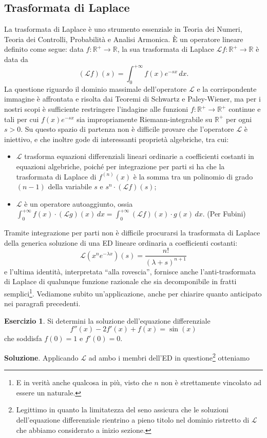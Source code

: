 \documentclass[a4paper,twoside]{article}
\newcommand{\R}{\mathbb{R}}
\theoremstyle{definition}
\newtheorem{ex}[theorem]{Esercizio}
\numberwithin{theorem}{section}
\begin{document}
\subsection{Trasformata di Laplace}
La trasformata di Laplace è uno strumento essenziale in Teoria dei Numeri, Teoria dei Controlli, Probabilità e Analisi Armonica. È un operatore lineare definito come segue: data $f:\R^+\to\R$, la sua trasformata di Laplace $\mathcal{L}f:\R^+\to \R$ è data da
$$ (\mathcal{L} f)(s) = \int_{0}^{+\infty} f(x) e^{-sx}\,dx. $$
La questione riguardo il dominio massimale dell'operatore $\mathcal{L}$ e la corrispondente immagine è affrontata e risolta dai Teoremi di Schwartz e Paley-Wiener, ma per i nostri scopi è sufficiente restringere l'indagine alle funzioni $f:\R^+\to\R^+$ continue e tali per cui $f(x)e^{-sx}$ sia impropriamente Riemann-integrabile su $\R^+$ per ogni $s>0$. Su questo spazio di partenza non è difficile provare che l'operatore $\mathcal{L}$ è iniettivo, e che inoltre gode di interessanti proprietà algebriche, tra cui:
\begin{itemize}
 \item $\mathcal{L}$ trasforma equazioni differenziali lineari ordinarie a coefficienti costanti in equazioni algebriche, poiché per integrazione per parti si ha che la trasformata di Laplace di $f^{(n)}(x)$ è la somma tra un polinomio di grado $(n-1)$ della variabile $s$ e $s^n\cdot(\mathcal{L}f)(s)$;
 \item $\mathcal{L}$ è un operatore autoaggiunto, ossia $\int_{0}^{+\infty}f(x)\cdot(\mathcal{L}g)(x)\,dx = \int_{0}^{+\infty}(\mathcal{L} f)(x)\cdot g(x)\,dx.$ (Per Fubini) 
\end{itemize}
Tramite integrazione per parti non è difficile procurarsi la trasformata di Laplace della generica soluzione di una ED lineare ordinaria a coefficienti costanti:
$$ \mathcal{L}\left( x^n e^{-\lambda x} \right)(s) = \frac{n!}{(\lambda+s)^{n+1}}$$
e l'ultima identità, interpretata ``alla rovescia'', fornisce anche l'anti-trasformata di Laplace di qualunque funzione razionale che sia decomponibile in fratti semplici\footnote{E in verità anche qualcosa in più, visto che $n$ non è strettamente vincolato ad essere un naturale.}. Vediamone subito un'applicazione, anche per chiarire quanto anticipato nei paragrafi precedenti.
\begin{ex} Si determini la soluzione dell'equazione differenziale 
$$ f''(x)-2f'(x)+f(x)=\sin(x) $$
che soddisfa $f(0)=1$ e $f'(0)=0$.
\end{ex}
\textbf{Soluzione}. Applicando $\mathcal{L}$ ad ambo i membri dell'ED in questione\footnote{Legittimo in quanto la limitatezza del seno assicura che le soluzioni dell'equazione differenziale rientrino a pieno titolo nel dominio ristretto di $\mathcal{L}$ che abbiamo considerato a inizio sezione.} otteniamo 
\end{document}
